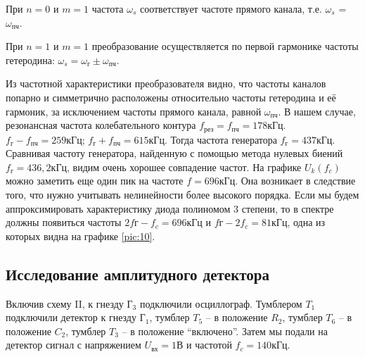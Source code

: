 При $n = 0$ и $m = 1$ частота $\omega_s$ соответствует частоте прямого канала, т.е. $\omega_s$ = $\omega _{\text{пч}}$.

При $n = 1$ и $m = 1$ преобразование осуществляется по первой гармонике частоты гетеродина: $\omega_{s} = \omega_{\text{г}} \pm \omega_{\text{пч}}$.

Из частотной характеристики преобразователя видно, что частоты каналов попарно
и симметрично расположены относительно частоты гетеродина и её гармоник, за исключением частоты прямого канала, равной $\omega_{\text{пч}}$. 
В нашем случае, резонансная частота колебательного контура $f_{\text{рез}} = f_{\text{пч}} = 178 \text{кГц}$.
$f_{\text{г}} - f_{\text{пч}} = 259 \text{кГц}$; $f_{\text{г}} + f_{\text{пч}} =615 \text{кГц}$. Тогда частота генератора $f_{\text{г}}= 437 \text{кГц}$. Сравнивая частоту генератора, найденную с помощью метода нулевых биений $f_{\text{г}}=436,2 \text{кГц}$, видим очень хорошее совпадение частот.
На графике $U_k(f_c)$ можно заметить еще один пик на частоте $f=696\text{кГц}$. Она возникает в следствие того, что нужно учитывать нелинейности более высокого порядка. Если мы будем аппроксимировать характеристику диода полиномом 3 степени, то в спектре должны появиться частоты $2f{\text{г}}-f_c=696 \text{кГц}$ и $f{\text{г}}-2f_c=81 \text{кГц}$, одна из которых видна на графике \ref{pic:10}.
\subsection{Исследование амплитудного детектора}
Включив схему II, к гнезду $\text{Г}_3$ подключили осциллограф. Тумблером $T_1$ подключили детектор к гнезду $\text{Г}_1$, тумблер $T_5$ -- в положение $R_2$, тумблер $T_6$ -- в положение $C_2$, тумблер $T_3$ -- в положение “включено”. Затем мы подали на детектор сигнал с напряжением $U_{\text{вх}} = 1 \text{В}$ и частотой $f_c = 140 \text{кГц}$.
